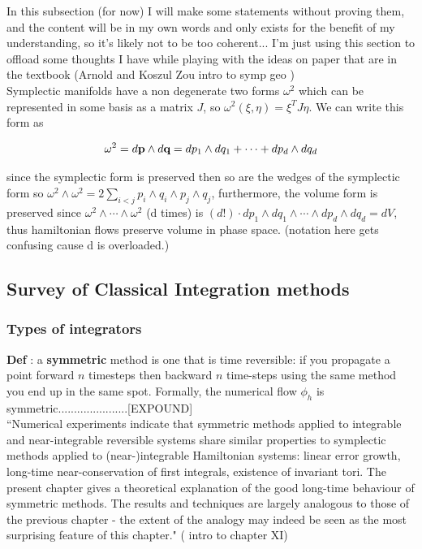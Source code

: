 \documentclass[12pt]{article}
\begin{document}
In this subsection (for now) I will make some statements without proving them, and the content will be in my own words and only exists for the benefit of my understanding, so it's likely not to be too coherent... I'm just using this section to offload some thoughts I have while playing with the ideas on paper that are in the textbook (Arnold \cite{Arnold} and Koszul Zou intro to symp geo \cite{KoszulZou})\\

Symplectic manifolds have a non degenerate two forms $\omega^2$ which can be represented in some basis as a matrix $J$, so $\omega^2(\xi,\eta) = \xi^TJ\eta$. We can write this form as

$$\omega^2 = d\textbf p \wedge d\textbf q = dp_1\wedge dq_1 + \cdots + d p_d\wedge dq_d$$

since the symplectic form is preserved then so are the wedges of the symplectic form so $\omega^2\wedge\omega^2 = 2\sum_{i<j}p_i\wedge q_i\wedge p_j\wedge q_j$, furthermore, the volume form is preserved since $\omega^2\wedge \cdots \wedge \omega^2$ (d times) is $(d!) \cdot dp_1\wedge dq_1\wedge \cdots \wedge dp_d\wedge dq_d = dV$, thus hamiltonian flows preserve volume in phase space. (notation here gets confusing cause d is overloaded.) \\




\subsection{Survey of Classical Integration methods}
\subsubsection{Types of integrators}

\textbf{Def} : a \textbf{symmetric} method is one that is time reversible: if you propagate a point forward $n$ timesteps then backward $n$ time-steps using the same method you end up in the same spot. Formally, the numerical flow $\phi_h$ is symmetric......................[EXPOUND]  \\

``Numerical experiments indicate that symmetric methods applied to integrable and near-integrable reversible systems share similar properties to symplectic methods applied to (near-)integrable Hamiltonian systems: linear error growth, long-time near-conservation of first integrals, existence of invariant tori. The present chapter gives a theoretical explanation of the good long-time behaviour of symmetric methods. The results and techniques are largely analogous to those of the previous chapter - the extent of the analogy may indeed be seen as the most surprising feature of this chapter." (\cite{Numerical} intro to chapter XI)\\
\end{document}
